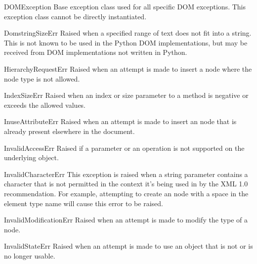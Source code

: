 \begin{excdesc}{DOMException}
  Base exception class used for all specific DOM exceptions.  This
  exception class cannot be directly instantiated.
\end{excdesc}

\begin{excdesc}{DomstringSizeErr}
  Raised when a specified range of text does not fit into a string.
  This is not known to be used in the Python DOM implementations, but
  may be received from DOM implementations not written in Python.
\end{excdesc}

\begin{excdesc}{HierarchyRequestErr}
  Raised when an attempt is made to insert a node where the node type
  is not allowed.
\end{excdesc}

\begin{excdesc}{IndexSizeErr}
  Raised when an index or size parameter to a method is negative or
  exceeds the allowed values.
\end{excdesc}

\begin{excdesc}{InuseAttributeErr}
  Raised when an attempt is made to insert an  node that
  is already present elsewhere in the document.
\end{excdesc}

\begin{excdesc}{InvalidAccessErr}
  Raised if a parameter or an operation is not supported on the
  underlying object.
\end{excdesc}

\begin{excdesc}{InvalidCharacterErr}
  This exception is raised when a string parameter contains a
  character that is not permitted in the context it's being used in by
  the XML 1.0 recommendation.  For example, attempting to create an
   node with a space in the element type name will
  cause this error to be raised.
\end{excdesc}

\begin{excdesc}{InvalidModificationErr}
  Raised when an attempt is made to modify the type of a node.
\end{excdesc}

\begin{excdesc}{InvalidStateErr}
  Raised when an attempt is made to use an object that is not or is no
  longer usable.
\end{excdesc}

